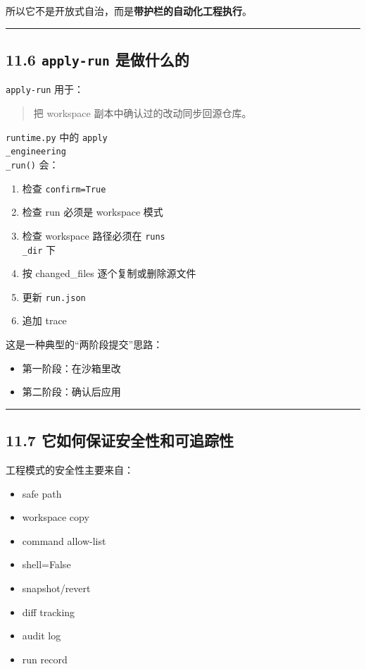 \documentclass[UTF8,12pt,openany]{ctexbook}
\begin{document}
所以它不是开放式自治，而是\textbf{带护栏的自动化工程执行}。\par

\hrule

\subsection{11.6 \texttt{apply-run} 是做什么的}

\texttt{apply-run} 用于：\par

\begin{quote}
把 workspace 副本中确认过的改动同步回源仓库。
\end{quote}

\texttt{runtime.py} 中的 \texttt{apply\\_engineering\\_run()} 会：\par

\begin{enumerate}
\item 检查 \texttt{confirm=True}
\item 检查 run 必须是 workspace 模式
\item 检查 workspace 路径必须在 \texttt{runs\\_dir} 下
\item 按 changed\_files 逐个复制或删除源文件
\item 更新 \texttt{run.json}
\item 追加 trace
\end{enumerate}

这是一种典型的“两阶段提交”思路：\par

\begin{itemize}
\item 第一阶段：在沙箱里改
\item 第二阶段：确认后应用
\end{itemize}

\hrule

\subsection{11.7 它如何保证安全性和可追踪性}

工程模式的安全性主要来自：\par

\begin{itemize}
\item safe path
\item workspace copy
\item command allow-list
\item shell=False
\item snapshot/revert
\item diff tracking
\item audit log
\item run record
\end{itemize}
\end{document}
